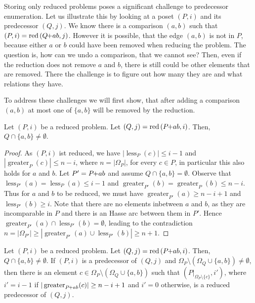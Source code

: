 \documentclass[twoside,leqno,twocolumn]{article}
\newcommand{\pchild}[3]{{#1}\kern-1pt{+}{#2}{#3}}
\newcommand{\reduced}[1]{\operatorname{red}{#1}}
\newcommand{\less}[2]{\operatorname{less}_{#1}(#2)}
\newcommand{\greater}[2]{\operatorname{greater}_{#1}(#2)}
\begin{document}
Storing only reduced problems poses a significant challenge to predecessor enumeration.
Let us illustrate this by looking at a poset $(P, i)$ and its predecessor $(Q, j)$.
We know there is a comparison $(a,b)$ such that $(P, i) = \reduced(\pchild{Q}{a}{b}, j)$.
However it is possible, that the edge $(a, b)$ is not in $P$, because either $a$ or $b$ could have been removed when reducing the problem.
The question is, how can we undo a comparison, that we cannot see?
Then, even if the reduction does not remove $a$ and $b$, there is still could be other elements that are removed.
There the challenge is to figure out how many they are and what relations they have.

To address these challenges we will first show, that after adding a comparison $(a, b)$ at most one of $\{a, b\}$ will be removed by the reduction.

\begin{lemma} \label{lemma:remove_only_last_element_edge}
  Let $(P, i)$ be a reduced problem.
  Let $(Q, j) = \reduced{(\pchild{P}{a}{b}, i)}$.
  Then, $Q \cap \{a ,b \} \neq \emptyset$.
\end{lemma}

\begin{proof}
  As $(P, i)$ ist reduced, we have $|\less{P}{c}| \le i - 1$ and $|\greater{P}{c}| \le n - i$, where $n = |\Omega_P|$, for every $c \in P$, in particular this also holds for $a$ and $b$.
  Let $P' = \pchild{P}{a}{b}$ and assume $Q \cap \{a ,b \} = \emptyset$.
  Observe that $\less{P'}{a} = \less{P}{a} \le i-1$ and $\greater{P'}{b} = \greater{P}{b} \le n - i$.
  Thus for $a$ and $b$ to be reduced, we must have $\greater{P'}{a} \ge n - i + 1$ and $\less{P'}{b} \ge i$.
  Note that there are no elements inbetween $a$ and $b$, as they are incomparable in $P$ and there is an Hasse arc between them in $P'$.
  Hence $\greater{P'}{a} \cap \less{P'}{b} = \emptyset$, leading to the contradiction $n = |\Omega_{P'}| \ge |\greater{P'}{a} \cup \less{P'}{b}| \ge n + 1$.
\end{proof}


\begin{lemma}
  Let $(P, i)$ be a reduced problem.
  Let $(Q, j) = \reduced{(\pchild{P}{a}{b}, i)}$.
  Then, $Q \cap \{a ,b \} \neq \emptyset$.
  If $(P, i)$ is a predecessor of $(Q, j)$ and $\Omega_P \setminus (\Omega_Q \cup \{a, b\}) \neq \emptyset$, then there is an element $c \in \Omega_P \setminus (\Omega_Q \cup \{a, b\})$ such that $(P|_{\Omega_P \setminus \{c\}}, i')$, where $i' = i - 1$ if $|\greater{\pchild{P}{a}{b}}{c}| \ge n-i+1$ and $i'=0$ otherwise, is a reduced predecessor of $(Q, j)$.
\end{lemma}
\end{document}

